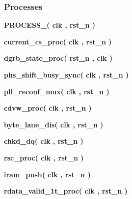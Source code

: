 \subsubsection*{Processes}
 \begin{DoxyCompactItemize}
\item 
{\bf P\+R\+O\+C\+E\+S\+S\+\_}{\bfseries  ( {\bfseries {\bfseries {\bf clk}} \textcolor{vhdlchar}{ }} , {\bfseries {\bfseries {\bf rst\+\_\+n}} \textcolor{vhdlchar}{ }} )}
\item 
{\bf current\+\_\+cs\+\_\+proc}{\bfseries  ( {\bfseries {\bfseries {\bf clk}} \textcolor{vhdlchar}{ }} , {\bfseries {\bfseries {\bf rst\+\_\+n}} \textcolor{vhdlchar}{ }} )}
\item 
{\bf dgrb\+\_\+state\+\_\+proc}{\bfseries  ( {\bfseries {\bfseries {\bf rst\+\_\+n}} \textcolor{vhdlchar}{ }} , {\bfseries {\bfseries {\bf clk}} \textcolor{vhdlchar}{ }} )}
\item 
{\bf phs\+\_\+shift\+\_\+busy\+\_\+sync}{\bfseries  ( {\bfseries {\bfseries {\bf clk}} \textcolor{vhdlchar}{ }} , {\bfseries {\bfseries {\bf rst\+\_\+n}} \textcolor{vhdlchar}{ }} )}
\item 
{\bf pll\+\_\+reconf\+\_\+mux}{\bfseries  ( {\bfseries {\bfseries {\bf clk}} \textcolor{vhdlchar}{ }} , {\bfseries {\bfseries {\bf rst\+\_\+n}} \textcolor{vhdlchar}{ }} )}
\item 
{\bf cdvw\+\_\+proc}{\bfseries  ( {\bfseries {\bfseries {\bf clk}} \textcolor{vhdlchar}{ }} , {\bfseries {\bfseries {\bf rst\+\_\+n}} \textcolor{vhdlchar}{ }} )}
\item 
{\bf byte\+\_\+lane\+\_\+dis}{\bfseries  ( {\bfseries {\bfseries {\bf clk}} \textcolor{vhdlchar}{ }} , {\bfseries {\bfseries {\bf rst\+\_\+n}} \textcolor{vhdlchar}{ }} )}
\item 
{\bf chkd\+\_\+dq}{\bfseries  ( {\bfseries {\bfseries {\bf clk}} \textcolor{vhdlchar}{ }} , {\bfseries {\bfseries {\bf rst\+\_\+n}} \textcolor{vhdlchar}{ }} )}
\item 
{\bf rsc\+\_\+proc}{\bfseries  ( {\bfseries {\bfseries {\bf clk}} \textcolor{vhdlchar}{ }} , {\bfseries {\bfseries {\bf rst\+\_\+n}} \textcolor{vhdlchar}{ }} )}
\item 
{\bf iram\+\_\+push}{\bfseries  ( {\bfseries {\bfseries {\bf clk}} \textcolor{vhdlchar}{ }} , {\bfseries {\bfseries {\bf rst\+\_\+n}} \textcolor{vhdlchar}{ }} )}
\item 
{\bf rdata\+\_\+valid\+\_\+1t\+\_\+proc}{\bfseries  ( {\bfseries {\bfseries {\bf clk}} \textcolor{vhdlchar}{ }} , {\bfseries {\bfseries {\bf rst\+\_\+n}} \textcolor{vhdlchar}{ }} )}

\end{DoxyCompactItemize}
